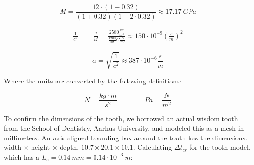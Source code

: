 
\begin{equation}
M = \frac{12 \cdot (1-0.32)}{(1+0.32)(1-2 \cdot 0.32)}
\approx 17.17 \ GPa
\end{equation}



\begin{equation}
\begin{aligned}
\frac{1}{c^2} &= \frac{\rho}{M}
= \frac{2580 \frac{kg}{m^3}}{\frac{1700}{99} G \frac{N}{m^2}}
\approx 150 \cdot 10^{-9} (\frac{s}{m})^2
\end{aligned}
\end{equation}


\begin{equation}
\alpha = \sqrt{\frac{1}{c^2}}
\approx 387 \cdot 10^{-6} \frac{s}{m}
\end{equation}

Where the units are converted by the following definitions:

\begin{equation}
N = \frac{kg \cdot m}{s^2} \qquad \qquad Pa = \frac{N}{m^2}
\end{equation}

To confirm the dimensions of the tooth, we borrowed an actual
wisdom tooth from the School of Dentistry, Aarhus University, and
modeled this as a mesh in 
millimeters. An axis aligned bounding box around the tooth has the
dimensions: width $\times$ height $\times$ depth,
$10.7 \times 20.1 \times 10.1$.
%
Calculating $\Delta t_{cr}$ for the tooth model, which has a
$L_e= 0.14 \ mm = 0.14 \cdot 10^{-3} \ m$:

